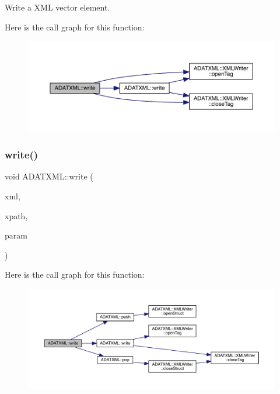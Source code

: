 Write a X\+ML vector element. 

Here is the call graph for this function\+:\nopagebreak
\begin{figure}[H]
\begin{center}
\leavevmode
\includegraphics[width=350pt]{d2/da3/group__io_ga442a3dd5472737a074d3774f46a94f14_cgraph}
\end{center}
\end{figure}
\mbox{\label{group__io_ga841e4774bcd8f9d6b7d0d8f0ae20d34f}} 
\subsubsection{\texorpdfstring{write()}{write()}\hspace{0.1cm}{\footnotesize\ttfamily [19/58]}}
{\footnotesize\ttfamily void A\+D\+A\+T\+X\+M\+L\+::write (\begin{DoxyParamCaption}\item[{\mbox{\hyperlink{classADATXML_1_1XMLWriter}{X\+M\+L\+Writer}} \&}]{xml,  }\item[{const std\+::string \&}]{xpath,  }\item[{const std\+::complex$<$ double $>$ \&}]{param }\end{DoxyParamCaption})}

Here is the call graph for this function\+:\nopagebreak
\begin{figure}[H]
\begin{center}
\leavevmode
\includegraphics[width=350pt]{d2/da3/group__io_ga841e4774bcd8f9d6b7d0d8f0ae20d34f_cgraph}
\end{center}
\end{figure}
\mbox{\label{group__io_ga79aaea02aba2cdc3c3374686eca9fd1e}} 
